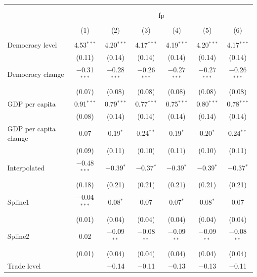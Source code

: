 \documentclass[a4paper]{article}\usepackage[]{graphicx}\usepackage[]{color}
\begin{document}
\begin{table}[!htbp] \centering 
  \caption{} 
  \label{} 
\small 
\begin{tabular}{@{\extracolsep{5pt}}lcccccc} 
\\[-1.8ex]\hline \\[-1.8ex] 
\\[-1.8ex] & \multicolumn{6}{c}{fp} \\ 
\\[-1.8ex] & (1) & (2) & (3) & (4) & (5) & (6)\\ 
\hline \\[-1.8ex] 
 Democracy level & 4.53$^{***}$ & 4.20$^{***}$ & 4.17$^{***}$ & 4.19$^{***}$ & 4.20$^{***}$ & 4.17$^{***}$ \\ 
  & (0.11) & (0.14) & (0.14) & (0.14) & (0.14) & (0.14) \\ 
  Democracy change & $-$0.31$^{***}$ & $-$0.28$^{***}$ & $-$0.26$^{***}$ & $-$0.27$^{***}$ & $-$0.27$^{***}$ & $-$0.26$^{***}$ \\ 
  & (0.07) & (0.08) & (0.08) & (0.08) & (0.08) & (0.08) \\ 
  GDP per capita & 0.91$^{***}$ & 0.79$^{***}$ & 0.77$^{***}$ & 0.75$^{***}$ & 0.80$^{***}$ & 0.78$^{***}$ \\ 
  & (0.08) & (0.14) & (0.14) & (0.14) & (0.14) & (0.14) \\ 
  GDP per capita change & 0.07 & 0.19$^{*}$ & 0.24$^{**}$ & 0.19$^{*}$ & 0.20$^{*}$ & 0.24$^{**}$ \\ 
  & (0.09) & (0.11) & (0.10) & (0.11) & (0.10) & (0.11) \\ 
  Interpolated & $-$0.48$^{***}$ & $-$0.39$^{*}$ & $-$0.37$^{*}$ & $-$0.39$^{*}$ & $-$0.39$^{*}$ & $-$0.37$^{*}$ \\ 
  & (0.18) & (0.21) & (0.21) & (0.21) & (0.21) & (0.21) \\ 
  Spline1 & $-$0.04$^{***}$ & 0.08$^{*}$ & 0.07 & 0.07$^{*}$ & 0.08$^{*}$ & 0.07 \\ 
  & (0.01) & (0.04) & (0.04) & (0.04) & (0.04) & (0.04) \\ 
  Spline2 & 0.02 & $-$0.09$^{**}$ & $-$0.08$^{**}$ & $-$0.09$^{**}$ & $-$0.09$^{**}$ & $-$0.08$^{**}$ \\ 
  & (0.01) & (0.04) & (0.04) & (0.04) & (0.04) & (0.04) \\ 
  Trade level &  & $-$0.14 & $-$0.11 & $-$0.13 & $-$0.13 & $-$0.11 \\ 

\end{tabular}
\end{table}
\end{document}

